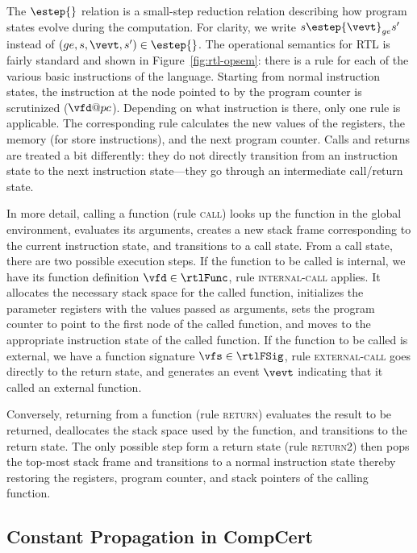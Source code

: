 The $\estep{}$ relation is a small-step reduction relation describing how program states evolve
during the computation.  For clarity, we write $s \estep{\vevt}_{ge} s'$ instead of
$(ge,s,\vevt,s')\in {\estep{}}$.  The operational semantics for RTL is fairly standard and shown in
Figure~\ref{fig:rtl-opsem}: there is a rule for each of the various basic instructions of the
language.  Starting from normal instruction states, the instruction at the node pointed to by the
program counter is scrutinized ($\vfd@pc$).  Depending on what instruction is there, only one rule
is applicable.  The corresponding rule calculates the new values of the registers, the memory (for
store instructions), and the next program counter.  Calls and returns are treated a bit differently:
they do not directly transition from an instruction state to the next instruction state---they go
through an intermediate call/return state.

In more detail, calling a function (rule \textsc{call}) looks up the function in the global
environment, evaluates its arguments, creates a new stack frame corresponding to the current
instruction state, and transitions to a call state.  From a call state, there are two possible
execution steps.  If the function to be called is internal, \ie we have its function definition
$\vfd\in\rtlFunc$, rule \textsc{internal-call} applies.  It allocates the necessary stack space for
the called function, initializes the parameter registers with the values passed as arguments, sets
the program counter to point to the first node of the called function, and moves to the appropriate
instruction state of the called function.  If the function to be called is external, \ie we have a
function signature $\vfs\in\rtlFSig$, rule \textsc{external-call} goes directly to the return state,
and generates an event $\vevt$ indicating that it called an external function.

Conversely, returning from a function (rule \textsc{return}) evaluates the result to be returned,
deallocates the stack space used by the function, and transitions to the return state.  The only
possible step form a return state (rule \textsc{return2}) then pops the top-most stack frame and
transitions to a normal instruction state thereby restoring the registers, program counter, and
stack pointers of the calling function.



\subsection{Constant Propagation in CompCert}
\label{sec:background:constprop}

